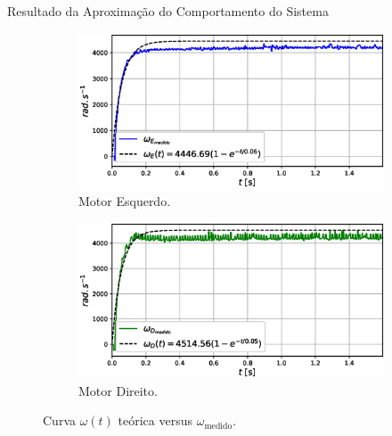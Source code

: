 \begin{frame}{Resultado da Aproximação do Comportamento do Sistema}


\begin{figure}
    \begin{subfigure}{.45\textwidth}
        \centering
        \includegraphics[width=\textwidth]{figuras/resultados/exp02/regressao_vs_medido_esquerdo100.eps}
        \caption{Motor Esquerdo.}
    \end{subfigure}
    \begin{subfigure}{.45\textwidth}
        \centering
        \includegraphics[width=\textwidth]{figuras/resultados/exp02/regressao_vs_medido_direito100.eps}
        \caption{Motor Direito.}
    \end{subfigure}
    \caption{Curva $\omega(t)$ teórica versus $\omega_{\text{medido}}$.}
\end{figure}
    
\end{frame}


